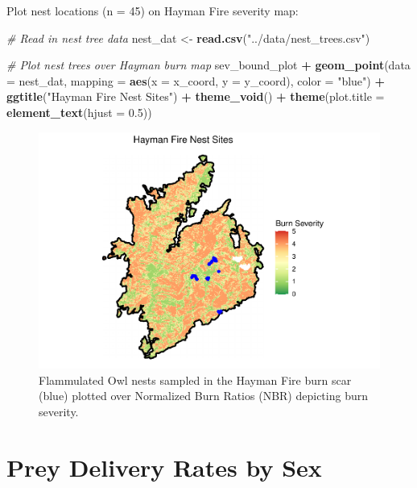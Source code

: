 \documentclass[]{article}
\newenvironment{Shaded}{\begin{snugshade}}{\end{snugshade}}
\newcommand{\CommentTok}[1]{\textcolor[rgb]{0.56,0.35,0.01}{\textit{#1}}}
\newcommand{\DataTypeTok}[1]{\textcolor[rgb]{0.13,0.29,0.53}{#1}}
\newcommand{\FloatTok}[1]{\textcolor[rgb]{0.00,0.00,0.81}{#1}}
\newcommand{\KeywordTok}[1]{\textcolor[rgb]{0.13,0.29,0.53}{\textbf{#1}}}
\newcommand{\NormalTok}[1]{#1}
\newcommand{\OperatorTok}[1]{\textcolor[rgb]{0.81,0.36,0.00}{\textbf{#1}}}
\newcommand{\StringTok}[1]{\textcolor[rgb]{0.31,0.60,0.02}{#1}}
\begin{document}
Plot nest locations (n = 45) on Hayman Fire severity map:

\begin{Shaded}
\begin{Highlighting}[]
\CommentTok{# Read in nest tree data}
\NormalTok{nest_dat <-}\StringTok{ }\KeywordTok{read.csv}\NormalTok{(}\StringTok{"../data/nest_trees.csv"}\NormalTok{)}

\CommentTok{# Plot nest trees over Hayman burn map}
\NormalTok{sev_bound_plot }\OperatorTok{+}
\StringTok{  }\KeywordTok{geom_point}\NormalTok{(}\DataTypeTok{data =}\NormalTok{ nest_dat, }\DataTypeTok{mapping =} \KeywordTok{aes}\NormalTok{(}\DataTypeTok{x =}\NormalTok{ x_coord, }\DataTypeTok{y =}\NormalTok{ y_coord), }\DataTypeTok{color =} \StringTok{"blue"}\NormalTok{) }\OperatorTok{+}
\StringTok{  }\KeywordTok{ggtitle}\NormalTok{(}\StringTok{"Hayman Fire Nest Sites"}\NormalTok{) }\OperatorTok{+}
\StringTok{  }\KeywordTok{theme_void}\NormalTok{() }\OperatorTok{+}
\StringTok{  }\KeywordTok{theme}\NormalTok{(}\DataTypeTok{plot.title =} \KeywordTok{element_text}\NormalTok{(}\DataTypeTok{hjust =} \FloatTok{0.5}\NormalTok{))}
\end{Highlighting}
\end{Shaded}

\begin{figure}
\centering
\includegraphics{../manuscript/figures/plot_severity-1.pdf}
\caption{Flammulated Owl nests sampled in the Hayman Fire burn scar
(blue) plotted over Normalized Burn Ratios (NBR) depicting burn
severity.}
\end{figure}

\hypertarget{prey-delivery-rates-by-sex}{%
\section{Prey Delivery Rates by Sex}\label{prey-delivery-rates-by-sex}}
\end{document}
